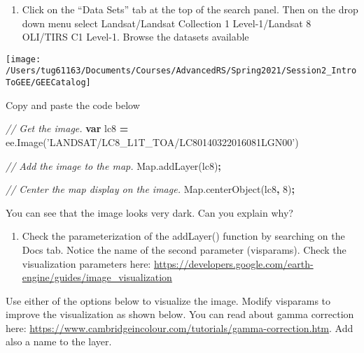 \documentclass[]{article}
\newenvironment{Shaded}{\begin{snugshade}}{\end{snugshade}}
\newcommand{\AttributeTok}[1]{\textcolor[rgb]{0.77,0.63,0.00}{#1}}
\newcommand{\CommentTok}[1]{\textcolor[rgb]{0.56,0.35,0.01}{\textit{#1}}}
\newcommand{\DecValTok}[1]{\textcolor[rgb]{0.00,0.00,0.81}{#1}}
\newcommand{\KeywordTok}[1]{\textcolor[rgb]{0.13,0.29,0.53}{\textbf{#1}}}
\newcommand{\NormalTok}[1]{#1}
\newcommand{\OperatorTok}[1]{\textcolor[rgb]{0.81,0.36,0.00}{\textbf{#1}}}
\newcommand{\StringTok}[1]{\textcolor[rgb]{0.31,0.60,0.02}{#1}}
\newcommand{\VariableTok}[1]{\textcolor[rgb]{0.00,0.00,0.00}{#1}}
\providecommand{\tightlist}{%
  \setlength{\itemsep}{0pt}\setlength{\parskip}{0pt}}
\begin{document}
\begin{enumerate}
\def\labelenumi{\arabic{enumi}.}
\setcounter{enumi}{2}
\tightlist
\item
  Click on the ``Data Sets'' tab at the top of the search panel. Then on
  the drop down menu select Landsat/Landsat Collection 1 Level-1/Landsat
  8 OLI/TIRS C1 Level-1. Browse the datasets available
\end{enumerate}

\texttt{[image: /Users/tug61163/Documents/Courses/AdvancedRS/Spring2021/Session2\_IntroToGEE/GEECatalog]}

Copy and paste the code below

\begin{Shaded}
\begin{Highlighting}[]
\CommentTok{// Get the image.}
\KeywordTok{var}\NormalTok{ lc8 }\OperatorTok{=} \VariableTok{ee}\NormalTok{.}\AttributeTok{Image}\NormalTok{(}\StringTok{'LANDSAT/LC8_L1T_TOA/LC80140322016081LGN00'}\NormalTok{)}

\CommentTok{// Add the image to the map.}
\VariableTok{Map}\NormalTok{.}\AttributeTok{addLayer}\NormalTok{(lc8)}\OperatorTok{;}

\CommentTok{// Center the map display on the image.}
\VariableTok{Map}\NormalTok{.}\AttributeTok{centerObject}\NormalTok{(lc8}\OperatorTok{,} \DecValTok{8}\NormalTok{)}\OperatorTok{;}
\end{Highlighting}
\end{Shaded}

You can see that the image looks very dark. Can you explain why?

\begin{enumerate}
\def\labelenumi{\arabic{enumi}.}
\setcounter{enumi}{3}
\tightlist
\item
  Check the parameterization of the addLayer() function by searching on
  the Docs tab. Notice the name of the second parameter (visparams).
  Check the visualization parameters here:
  \url{https://developers.google.com/earth-engine/guides/image_visualization}
\end{enumerate}

Use either of the options below to visualize the image. Modify visparams
to improve the visualization as shown below. You can read about gamma
correction here:
\url{https://www.cambridgeincolour.com/tutorials/gamma-correction.htm}.
Add also a name to the layer.
\end{document}
